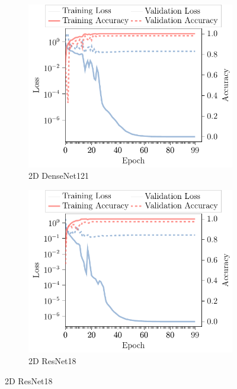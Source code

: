 \begin{subappendices}
\begin{figure}
\begin{subfigure}[t]{\modelplotwidth}
    \centering
    \includegraphics[width=\textwidth]{Figures/Appendix/DenseNet_2D.pdf}
    \caption{2D DenseNet121}\label{fig:DenseNet2D}
\end{subfigure}
\begin{subfigure}[t]{\modelplotwidth}
    \centering
    \includegraphics[width=\textwidth]{Figures/Appendix/ResNet_2D.pdf}
    \caption{2D ResNet18}\label{fig:ResNet2D}
\end{subfigure}


\end{figure}
\end{subappendices}
